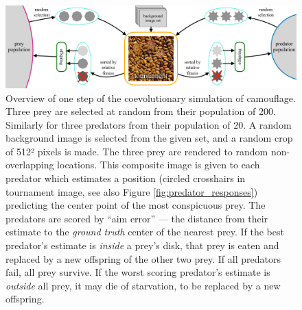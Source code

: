 \documentclass[acmtog,
    anonymous,
    review
    ]{acmart}
\newcommand{\jargon}[1]{\textit{#1}}
\begin{document}
\begin{figure}
    \includegraphics[width=\textwidth]{coc_overview.pdf}
    \caption{Overview of one step of the coevolutionary simulation of camouflage. Three prey are selected at random from their population of 200. Similarly for three predators from their population of 20. A random background image is selected from the given set, and a random crop of 512² pixels is made. The three prey are rendered to random non-overlapping locations. This composite image is given to each predator which estimates a position (circled crosshairs in tournament image, see also Figure \ref{fig:predator_responses}) predicting the center point of the most conspicuous prey. The predators are scored by “aim error” — the distance from their estimate to the \jargon{ground truth} center of the nearest prey. If the best predator's estimate is \textit{inside} a prey's disk, that prey is eaten and replaced by a new offspring of the other two prey. If all predators fail, all prey survive. If the worst scoring predator's estimate is \textit{outside} all prey, it may die of starvation, to be replaced by a new offspring.}
    \label{fig:simulation_overview}
\end{figure}

\end{document}
